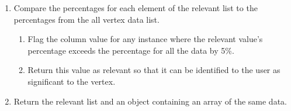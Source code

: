 \begin{enumerate}
  \item Compare the percentages for each element of the relevant list to
  the percentages from the all vertex data list.
  \begin{enumerate}
    \item Flag the column value for any instance where the relevant value's
    percentage exceeds the percentage for all the data by 5\%.
    \item Return this value as relevant so that it can be identified to the user
    as significant to the vertex.
  \end{enumerate}
  \item Return the relevant list and an object containing an array
  of the same data.
\end{enumerate}
\pagebreak

